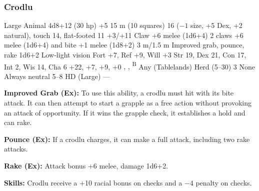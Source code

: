 \subsubsection{Crodlu}
\begin{MonsterStats}
{Large Animal}
{4d8+12 (30 hp)}
{+5}
{15 m (10 squares)}
{16 ($-1$ size, +5 Dex, +2 natural), touch 14, flat-footed 11}
{+3/+11}
{Claw +6 melee (1d6+4)}
{2 claws +6 melee (1d6+4) and bite +1 melee (1d8+2)}
{3 m/1.5 m}
{Improved grab, pounce, rake 1d6+2}
{Low-light vision}
{Fort +7, Ref +9, Will +3}
{Str 19, Dex 21, Con 17, Int 2, Wis 14, Cha 6}
{ +22,  +7,  +9,  +0}
{, , \textsuperscript{B}}
{Any (Tablelands)}
{Herd (5--30)}
{3}
{None}
{Always neutral}
{5--8 HD (Large)}
{---}
\end{MonsterStats}

\textbf{Improved Grab (Ex):} To use this ability, a crodlu must hit with its bite attack. It can then attempt to start a grapple as a free action without provoking an attack of opportunity. If it wins the grapple check, it establishes a hold and can rake.

\textbf{Pounce (Ex):} If a crodlu charges, it can make a full attack, including two rake attacks.

\textbf{Rake (Ex):} Attack bonus +6 melee, damage 1d6+2.

\textbf{Skills:} Crodlu receive a +10 racial bonus on  checks and a $-4$ penalty on  checks.
